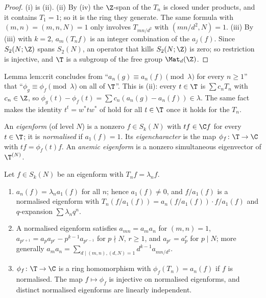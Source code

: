 \begin{proof}
(i) is (ii). (ii) By (iv) the $\Z$-span of the $T_n$ is closed under products, and it contains $T_1=1$; so it is the ring they
generate. The same formula with $(m,n)=(m,n,N)=1$ only involves $T_{mn/d^2}$ with $(mn/d^2,N)=1$. (iii) By (iii) with $k=2$, $a_m(T_nf)$ is an integer combination of
the $a_j(f)$. Since $S_2(N;\Z)$ spans $S_2(N)$, an operator that kills $S_2(N;\Z)$ is zero; so restriction is injective, and $\T$ is a subgroup of the free group $\Mat_d(\Z)$.
\end{proof}

\begin{paperlink}\label{pl:hecke:span}
Lemma lem:crit concludes from ``$a_n(g)\equiv a_n(f)\pmod\lambda$ for every $n\ge1$'' that ``$\phi_g\equiv\phi_f\pmod\lambda$ on all of $\T$''. This is (ii): every
$t\in\T$ is $\sum c_nT_n$ with $c_n\in\Z$, so $\phi_g(t)-\phi_f(t)=\sum c_n(a_n(g)-a_n(f))\in\lambda$. The same fact makes the identity $t^t=w^*tw^*$ of  hold for
all $t\in\T$ once it holds for the $T_n$.
\end{paperlink}

\begin{definition}\label{def:hecke:eigenform}
An \emph{eigenform} (of level $N$) is a nonzero $f\in S_k(N)$ with $tf\in\C f$ for every $t\in\T$; it is \emph{normalised} if $a_1(f)=1$. Its \emph{eigencharacter} is the map
$\phi_f\colon\T\to\C$ with $tf=\phi_f(t)f$. An \emph{anemic eigenform} is a nonzero simultaneous eigenvector of $\T^{(N)}$.
\end{definition}

\begin{proposition}\label{prop:hecke:eigenforms}
Let $f\in S_k(N)$ be an eigenform with $T_nf=\lambda_nf$.
\begin{enumerate}[label=(\roman*)]
\item $a_n(f)=\lambda_na_1(f)$ for all $n$; hence $a_1(f)\ne0$, and $f/a_1(f)$ is a normalised eigenform with $T_n(f/a_1(f))=a_n(f/a_1(f))\cdot f/a_1(f)$ and $q$-expansion $\sum\lambda_nq^n$.
\item A normalised eigenform satisfies $a_{mn}=a_ma_n$ for $(m,n)=1$, $a_{p^{r+1}}=a_pa_{p^r}-p^{k-1}a_{p^{r-1}}$ for $p\nmid N$, $r\ge1$, and $a_{p^r}=a_p^r$ for $p\mid N$; more generally
$a_ma_n=\sum_{d\mid(m,n),(d,N)=1}d^{k-1}a_{mn/d^2}$.
\item $\phi_f\colon\T\to\C$ is a ring homomorphism with $\phi_f(T_n)=a_n(f)$ if $f$ is normalised. The map $f\mapsto\phi_f$ is injective on normalised eigenforms, and distinct normalised
eigenforms are linearly independent.
\end{enumerate}
\end{proposition}

